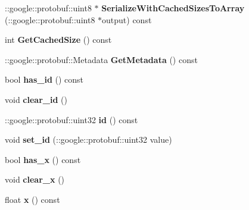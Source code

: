 \begin{DoxyCompactItemize}
\item 
\+::google\+::protobuf\+::uint8 $\ast$ {\bfseries Serialize\+With\+Cached\+Sizes\+To\+Array} (\+::google\+::protobuf\+::uint8 $\ast$output) const \hypertarget{classvss__debug_1_1Pose_a9e10aa3d673a4f63862c2f66b80638c1}{}\label{classvss__debug_1_1Pose_a9e10aa3d673a4f63862c2f66b80638c1}

\item 
int {\bfseries Get\+Cached\+Size} () const \hypertarget{classvss__debug_1_1Pose_a46c892f974e6ba28a29ea32e27367c88}{}\label{classvss__debug_1_1Pose_a46c892f974e6ba28a29ea32e27367c88}

\item 
\+::google\+::protobuf\+::\+Metadata {\bfseries Get\+Metadata} () const \hypertarget{classvss__debug_1_1Pose_a98b13a5bc79f0d02a65a7ec85cb57789}{}\label{classvss__debug_1_1Pose_a98b13a5bc79f0d02a65a7ec85cb57789}

\item 
bool {\bfseries has\+\_\+id} () const \hypertarget{classvss__debug_1_1Pose_ad72613607a13a12b132e57c0fd756a25}{}\label{classvss__debug_1_1Pose_ad72613607a13a12b132e57c0fd756a25}

\item 
void {\bfseries clear\+\_\+id} ()\hypertarget{classvss__debug_1_1Pose_a327c72e990af33588f022f6bce4a5468}{}\label{classvss__debug_1_1Pose_a327c72e990af33588f022f6bce4a5468}

\item 
\+::google\+::protobuf\+::uint32 {\bfseries id} () const \hypertarget{classvss__debug_1_1Pose_aed2bcdb9df579a04e1a68dc2901d3584}{}\label{classvss__debug_1_1Pose_aed2bcdb9df579a04e1a68dc2901d3584}

\item 
void {\bfseries set\+\_\+id} (\+::google\+::protobuf\+::uint32 value)\hypertarget{classvss__debug_1_1Pose_abbf89801fee07e75b45b99414db5acf2}{}\label{classvss__debug_1_1Pose_abbf89801fee07e75b45b99414db5acf2}

\item 
bool {\bfseries has\+\_\+x} () const \hypertarget{classvss__debug_1_1Pose_a7dedd1bb04803183b4706163279f1115}{}\label{classvss__debug_1_1Pose_a7dedd1bb04803183b4706163279f1115}

\item 
void {\bfseries clear\+\_\+x} ()\hypertarget{classvss__debug_1_1Pose_a29bc420263638de043482d7a8ac58b9f}{}\label{classvss__debug_1_1Pose_a29bc420263638de043482d7a8ac58b9f}

\item 
float {\bfseries x} () const \hypertarget{classvss__debug_1_1Pose_a9dd4c62ce4845393ac1524b730aafad3}{}\label{classvss__debug_1_1Pose_a9dd4c62ce4845393ac1524b730aafad3}


\end{DoxyCompactItemize}
